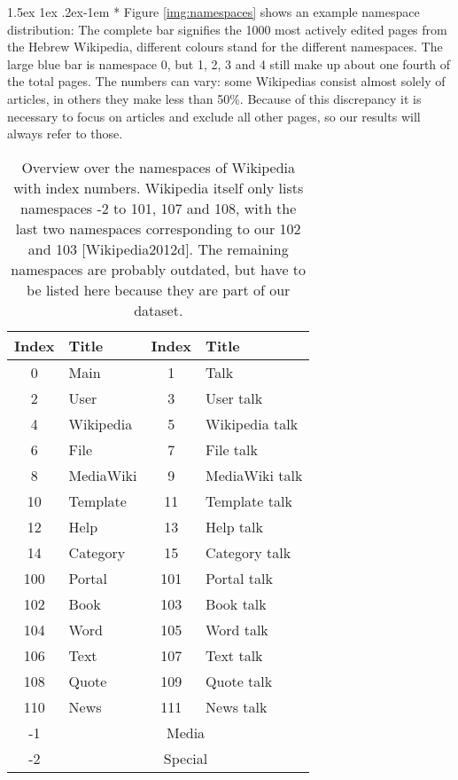 \documentclass[a4paper,12pt,twoside]{article}
\makeatletter
\renewcommand{\paragraph}{%
  \@startsection{paragraph}{4}%
  {\z@}{1.5ex \@plus 1ex \@minus .2ex}{-1em}%
  {\normalfont\normalsize\bfseries}%
}
\makeatother
\begin{document}
\paragraph*{} Figure \ref{img:namespaces} shows an example namespace distribution: The complete bar signifies the 1000 most actively edited pages from the Hebrew Wikipedia, different colours stand for the different namespaces. The large blue bar is namespace 0, but 1, 2, 3 and 4 still make up about one fourth of the total pages. The numbers can vary: some Wikipedias consist almost solely of articles, in others they make less than 50\%. Because of this discrepancy it is necessary to focus on articles and exclude all other pages, so our results will always refer to those.\\
\begin{table}[htb]
\begin{center}
\begin{tabular}{|c|l|c|l|}
\hline
{\bf Index} & {\bf Title} & {\bf Index} & {\bf Title}\\
\hline
0 & Main & 1 & Talk\\
\hline
2 & User & 3 & User talk\\
\hline
4 & Wikipedia & 5 & Wikipedia talk\\
\hline
6 & File & 7 & File talk\\
\hline
8 & MediaWiki & 9 & MediaWiki talk\\
\hline
10 & Template & 11 & Template talk\\
\hline
12 & Help & 13 & Help talk\\
\hline
14 & Category & 15 & Category talk\\
\hline
100 & Portal & 101 & Portal talk\\
\hline
102 & Book & 103 & Book talk\\
\hline
104 & Word & 105 & Word talk\\
\hline
106 & Text & 107 & Text talk\\
\hline
108 & Quote & 109 & Quote talk\\
\hline
110 & News & 111 & News talk\\
\hline
-1 & \multicolumn{3}{|c|}{Media}\\
\hline
-2 & \multicolumn{3}{|c|}{Special}\\
\hline
\end{tabular} 
\end{center}
\vspace{-12pt}
\label{tbl:namespaces}
\caption{Overview over the namespaces of Wikipedia with index numbers. Wikipedia itself only lists namespaces -2 to 101, 107 and 108, with the last two namespaces corresponding to our 102 and 103 [{\sc Wikipedia}2012d]. The remaining namespaces are probably outdated, but have to be listed here because they are part of our dataset.}
\end{table}
\newpage
\end{document}
